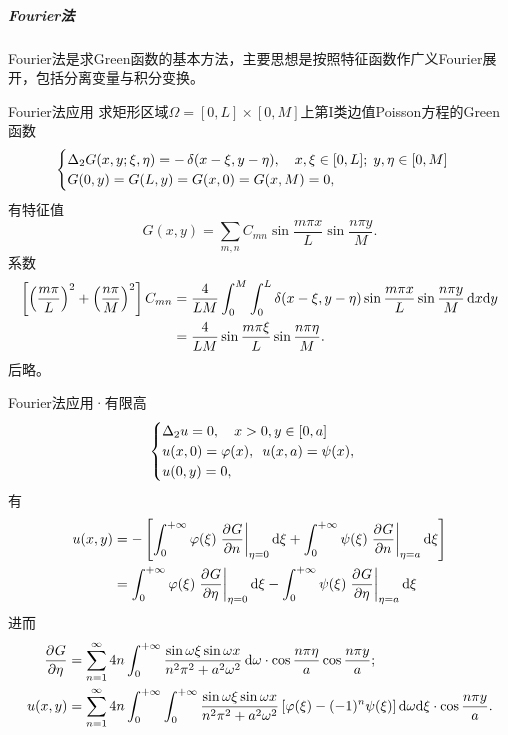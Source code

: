 \subparagraph*{Fourier法}
Fourier法是求Green函数的基本方法，主要思想是按照特征函数作广义Fourier展开，包括分离变量与积分变换。
\begin{example}{Fourier法应用}{}	
	求矩形区域$\Omega=[0,L]\times[0,M]$上第I类边值Poisson方程的Green函数
	\begin{align*}
		\begin{cases}
			\Delta_2G(x,y;\xi,\eta)=-\mathop{}\!\delta(x-\xi,y-\eta),\quad x,\xi\in[0,L];\;y,\eta\in[0,M]\\
			G(0,y)=G(L,y)=G(x,0)=G(x,M)=0,
		\end{cases}
	\end{align*}
	有特征值 
	\[
		G(x,y)=\sum_{m,n}C_{mn}\sin\frac{m\pi x}L\sin\frac{n\pi y}M.
	\]
	系数 
	{\footnotesize
	\begin{align*}
		\left[\left(\frac{m\pi}L\right)^2+\left(\frac{n\pi}M\right)^2\right]C_{mn}&=\frac4{LM}\int_0^M\int_0^L\mathop{}\!\delta(x-\xi,y-\eta)\sin\frac{m\pi x}L\sin\frac{n\pi y}M\mathop{}\!\mathrm{d} x\mathrm{d} y\\
		&=\frac4{LM}\sin\frac{m\pi\xi}L\sin\frac{n\pi\eta}M.
	\end{align*}}
	后略。
\end{example}
\begin{example}{Fourier法应用·有限高}{}
	\begin{equation*}
		\begin{cases}
			\Delta_2u=0,\quad x>0,y\in[0,a]\\
			u(x,0)=\varphi(x),\enspace u(x,a)=\psi(x),\\
			u(0,y)=0,
		\end{cases}
	\end{equation*}
	有
	\begin{align*}
		u(x,y)&=-\left[\int_0^{+\infty}\varphi(\xi)\left.\frac{\partial^{{}}G}{\partial{n}^{{}}}\right\rvert_{\eta=0}\mathop{}\!\mathrm{d}\xi+\int_0^{+\infty}\psi(\xi)\left.\frac{\partial^{{}}G}{\partial{n}^{{}}}\right\rvert_{\eta=a}\mathop{}\!\mathrm{d}\xi\right]\\
		&=\int_0^{+\infty}\varphi(\xi)\left.\frac{\partial^{{}}G}{\partial{\eta}^{{}}}\right\rvert_{\eta=0}\mathop{}\!\mathrm{d}\xi-\int_0^{+\infty}\psi(\xi)\left.\frac{\partial^{{}}G}{\partial{\eta}^{{}}}\right\rvert_{\eta=a}\mathop{}\!\mathrm{d}\xi
	\end{align*}
	进而
	\begin{align*}
		\frac{\partial^{{}}G}{\partial{\eta}^{{}}}&=\sum_{n=1}^\infty4n\int_0^{+\infty}\frac{\sin\omega\xi\sin\omega x}{n^2\pi^2+a^2\omega^2}\mathop{}\!\mathrm{d}\omega\cdot\cos\frac{n\pi\eta}a\cos\frac{n\pi y}a;\\
		u(x,y)&=\sum_{n=1}^\infty4n\int_0^{+\infty}\int_0^{+\infty}\frac{\sin\omega\xi\sin\omega x}{n^2\pi^2+a^2\omega^2}\left[\varphi(\xi)-(-1)^n\psi(\xi)\right]\mathop{}\!\mathrm{d}\omega\mathrm{d}\xi\cdot\cos\frac{n\pi y}a.
	\end{align*}
\end{example}
